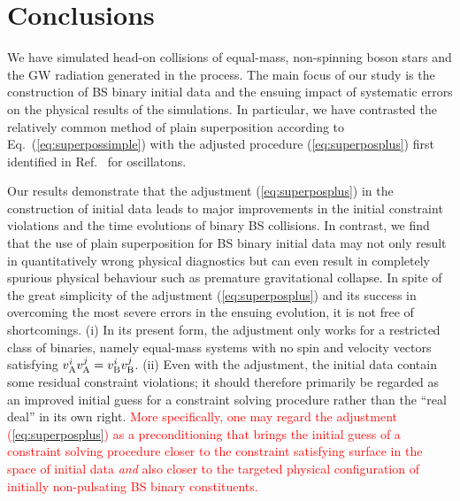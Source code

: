 \documentclass[]{iopart}
\newcommand{\new}[1]{\textcolor{red}{#1}}
\begin{document}
\section{Conclusions}
\label{sec:conclusions}
%
We have simulated head-on collisions of equal-mass, non-spinning
boson stars and the GW radiation generated in the process.  The
main focus of our study is the construction of BS binary initial
data and the ensuing impact of systematic errors on the physical
results of the simulations. In particular, we have contrasted the
relatively common method of plain superposition according to
Eq.~(\ref{eq:superpossimple}) with the adjusted procedure
(\ref{eq:superposplus}) first identified in Ref.~\cite{Helfer:2018vtq}
for oscillatons.

Our results demonstrate that the adjustment (\ref{eq:superposplus})
in the construction of initial data leads to major improvements in
the initial constraint violations and the time evolutions of binary
BS collisions. In contrast, we find that the use of plain superposition
for BS binary initial data may not only result in quantitatively
wrong physical diagnostics but can even result in completely spurious
physical behaviour such as premature gravitational collapse. In
spite of the great simplicity of the adjustment (\ref{eq:superposplus})
and its success in overcoming the most severe errors in the ensuing
evolution, it is not free of shortcomings.  (i) In its present form,
the adjustment only works for a restricted class of binaries, namely
equal-mass systems with no spin and velocity vectors satisfying
$v_{\rm A}^i v_{\rm A}^j=v_{\rm B}^i v_{\rm B}^j$. (ii) Even with
the adjustment, the initial data contain some residual constraint
violations; it should therefore primarily be regarded as an improved
initial guess for a constraint solving procedure rather than the
``real deal'' in its own right.
\new{More specifically, one may regard the adjustment (\ref{eq:superposplus})
as a preconditioning that brings the initial guess of a constraint
solving procedure closer to the constraint satisfying surface in
the space of initial data {\em and}
also closer to the targeted physical configuration of initially
non-pulsating BS binary constituents.}
\end{document}
